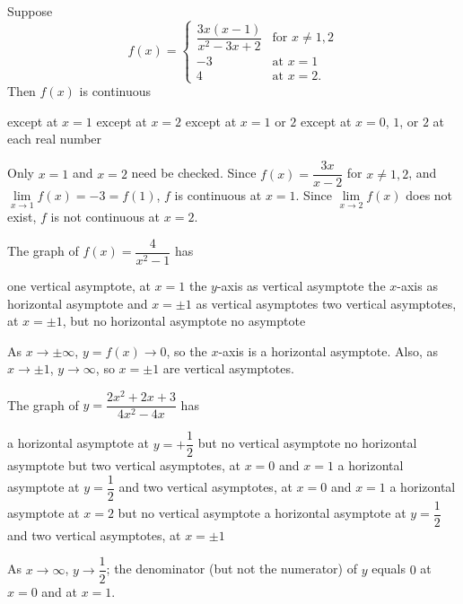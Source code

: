 \newpage

\question
Suppose
\[
f(x)=\begin{cases}\dfrac{3 x(x-1)}{x^{2}-3 x+2} & \text{for } x \neq 1,2 \\ -3 & \text{at } x=1 \\ 4 & \text{at } x=2.\end{cases}
\]
Then $f(x)$ is continuous
\begin{choices}
  \choice except at $x=1$
  \CorrectChoice except at $x=2$
  \choice except at $x=1$ or $2$
  \choice except at $x=0$, $1$, or $2$
  \choice at each real number
\end{choices}
\begin{solution}
Only $x=1$ and $x=2$ need be checked. Since $f(x)=\dfrac{3 x}{x-2}$ for $x \neq 1,2$, and $\lim\limits_{x \to 1} f(x)=-3=f(1)$, $f$ is continuous at $x=1$. Since $\lim\limits_{x \to 2} f(x)$ does not exist, $f$ is not continuous at $x=2$.
\end{solution}

\question
The graph of $f(x)=\dfrac{4}{x^{2}-1}$ has
\begin{choices}
  \choice one vertical asymptote, at $x=1$
  \choice the $y$-axis as vertical asymptote
  \CorrectChoice the $x$-axis as horizontal asymptote and $x=\pm 1$ as vertical asymptotes
  \choice two vertical asymptotes, at $x=\pm 1$, but no horizontal asymptote
  \choice no asymptote
\end{choices}
\begin{solution}
As $x \rightarrow \pm \infty$, $y=f(x) \rightarrow 0$, so the $x$-axis is a horizontal asymptote. Also, as $x \rightarrow \pm 1$, $y \rightarrow \infty$, so $x=\pm 1$ are vertical asymptotes.
\end{solution}

\question
The graph of $y=\dfrac{2 x^{2}+2 x+3}{4 x^{2}-4 x}$ has
\begin{choices}
  \choice a horizontal asymptote at $y=+\dfrac{1}{2}$ but no vertical asymptote
  \choice no horizontal asymptote but two vertical asymptotes, at $x=0$ and $x=1$
  \CorrectChoice a horizontal asymptote at $y=\dfrac{1}{2}$ and two vertical asymptotes, at $x=0$ and $x=1$
  \choice a horizontal asymptote at $x=2$ but no vertical asymptote
  \choice a horizontal asymptote at $y=\dfrac{1}{2}$ and two vertical asymptotes, at $x=\pm 1$
\end{choices}
\begin{solution}
As $x \rightarrow \infty$, $y \rightarrow \dfrac{1}{2}$; the denominator (but not the numerator) of $y$ equals $0$ at $x=0$ and at $x=1$.
\end{solution}


